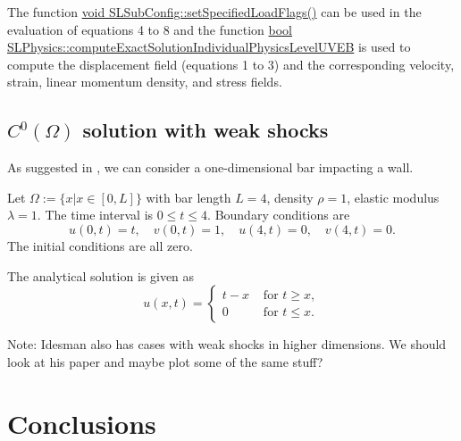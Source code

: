 \documentclass[12pt]{article}
\begin{document}
The function \underline{void SLSubConfig::setSpecifiedLoadFlags()} can be used in the evaluation of equations 4 to 8 and the function 
 \underline{bool SLPhysics::computeExactSolutionIndividualPhysicsLevelUVEB} is used to compute the displacement field (equations 1 to 3) and the corresponding velocity, strain, linear momentum density, and stress fields.

\subsection{$C^0(\Omega)$ solution with weak shocks}

As suggested in \cite{Idesman2014}, we can consider a one-dimensional bar
impacting a wall.

Let $\Omega := \{x | x\in[0,L]\}$ with bar length $L=4$, density $\rho=1$,
elastic modulus $\lambda = 1$.  The time interval is $0\le t \le 4$.
Boundary conditions are
\begin{equation}
u(0,t)=t, \quad
v(0,t)=1, \quad
u(4,t)=0, \quad
v(4,t)=0.
\end{equation}
The initial conditions are all zero.

The analytical solution is given as
\begin{equation}
u(x,t) = \begin{cases}
t-x & \text{ for } t \ge x,\\
0 & \text{ for } t \le x.
\end{cases}
\end{equation}

Note:  Idesman also has cases with weak shocks in higher dimensions.  We should look
at his paper and maybe plot some of the same stuff?


\section{Conclusions}

 

\end{document}
